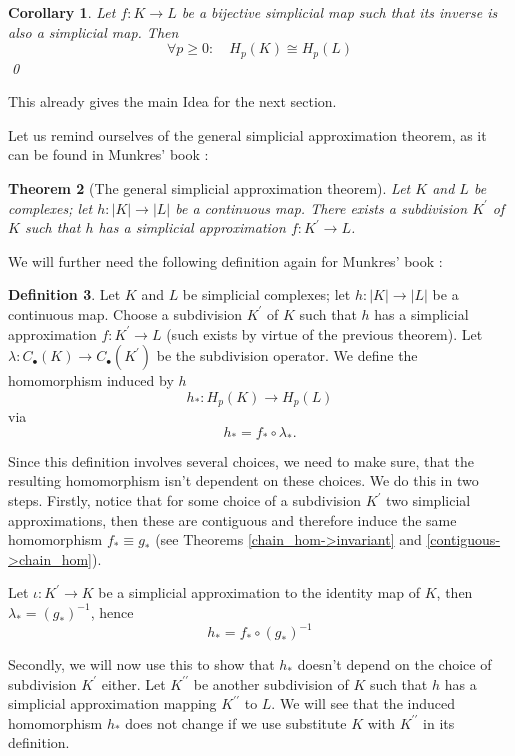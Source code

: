 \documentclass[toc=bib]{scrartcl}
\theoremstyle{plain}
\newtheorem{theorem}{Theorem}[section]
\newtheorem{corollary}[theorem]{Corollary}
\theoremstyle{definition}
\newtheorem	{definition}[theorem]{Definition}
\theoremstyle{remark}
\newcommand{\pprime}{{\prime\prime}}
\newcommand{\isom}{\cong}
\begin{document}
\begin{corollary}\label{baby-case}
	Let $f: K\to L$ be a bijective simplicial map such that its inverse is also a simplicial map. Then \[
	\forall p\geq 0:\quad H_p(K)\isom H_p(L)
	\]\qed
\end{corollary}

This already gives the main Idea for the next section.

Let us remind ourselves of the general simplicial approximation theorem, as it can be found in Munkres' book \cite[Thm. 16.5, p. 85]{mu}:

\begin{theorem}[The general simplicial approximation theorem]
	Let $K$ and $L$ be complexes; let $h: |K|\to |L|$ be a continuous map. There exists a subdivision $K^\prime$ of $K$ such that $h$ has a simplicial approximation $f:K^\prime \to L$.
\end{theorem}

We will further need the following definition again for Munkres' book \cite[p. 100]{mu}:
\begin{definition}
	Let $K$ and $L$ be simplicial complexes; let $h:|K|\to |L|$ be a continuous map. Choose a subdivision $K^\prime$ of $K$ such that $h$ has a simplicial approximation $f:K^\prime\to L$ (such exists by virtue of the previous theorem). Let $\lambda:C_\bullet(K)\to C_\bullet(K^\prime)$ be the subdivision operator. We define the homomorphism induced by $h$ 
	\[
	h_\ast: H_p(K)\to H_p(L)
	\]
	via
	\[
	h_\ast=f_\ast\circ \lambda_\ast.
	\]
\end{definition}


Since this definition involves several choices, we need to make sure, that the resulting homomorphism isn't dependent on these choices. We do this in two steps. Firstly, notice that for some choice of a subdivision $K^\prime$ two simplicial approximations, then these are contiguous and therefore induce the same homomorphism $f_\ast\equiv g_\ast$ (see Theorems \ref{chain_hom->invariant} and \ref{contiguous->chain_hom}).

Let $\iota: K^\prime\to K $ be a simplicial approximation to the identity map of $K$, then $\lambda_\ast=(g_\ast)^{-1}$, hence
\[
h_\ast=f_\ast\circ(g_\ast)^{-1}
\]

Secondly, we will now use this to show that $h_\ast$ doesn't depend on the choice of subdivision $K^\prime$ either. Let $K^\pprime$ be another subdivision of $K$ such that $h$ has a simplicial approximation mapping $K^\pprime$ to $L$. We will see that the induced homomorphism $h_\ast$ does not change if we use substitute $K$ with $K^\pprime$ in its definition.
\end{document}
